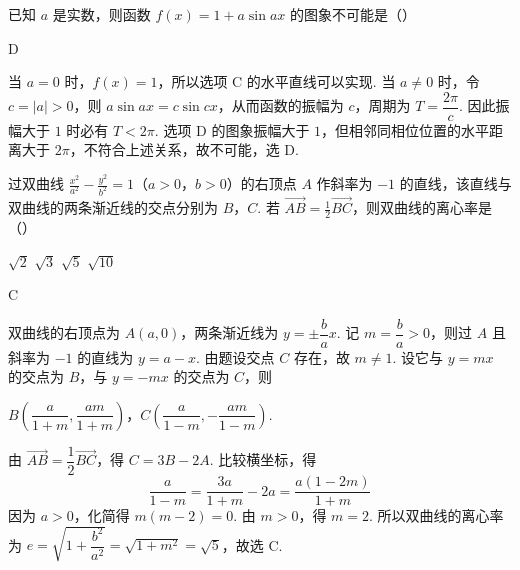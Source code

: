 \begin{problem}
已知 \(a\) 是实数，则函数 \(f(x)=1+a\sin ax\) 的图象不可能是（\quad）

    {}
    {}
    {}
\end{problem}

\begin{answer}
D
\end{answer}

\begin{solution}
当 \(a=0\) 时，\(f(x)=1\)，所以选项 C 的水平直线可以实现. 当 \(a\neq0\) 时，令 \(c=|a|>0\)，则 \(a\sin ax=c\sin cx\)，从而函数的振幅为 \(c\)，周期为 \(T=\dfrac{2\pi}{c}\). 因此振幅大于 \(1\) 时必有 \(T<2\pi\). 选项 D 的图象振幅大于 \(1\)，但相邻同相位位置的水平距离大于 \(2\pi\)，不符合上述关系，故不可能，选 D.
\end{solution}

\begin{problem}
过双曲线 \(\frac{x^2}{a^2}-\frac{y^2}{b^2}=1\)（\(a>0\)，\(b>0\)）的右顶点 \(A\) 作斜率为 \(-1\) 的直线，该直线与双曲线的两条渐近线的交点分别为 \(B\)，\(C\). 若 \(\overrightarrow{AB}=\frac{1}{2}\overrightarrow{BC}\)，则双曲线的离心率是（\quad）

\choices
    {\(\sqrt{2}\)}
    {\(\sqrt{3}\)}
    {\(\sqrt{5}\)}
    {\(\sqrt{10}\)}
\end{problem}

\begin{answer}
C
\end{answer}

\begin{solution}
双曲线的右顶点为 \(A(a,0)\)，两条渐近线为 \(y=\pm\dfrac{b}{a}x\). 记 \(m=\dfrac{b}{a}>0\)，则过 \(A\) 且斜率为 \(-1\) 的直线为 \(y=a-x\). 由题设交点 \(C\) 存在，故 \(m\ne1\). 设它与 \(y=mx\) 的交点为 \(B\)，与 \(y=-mx\) 的交点为 \(C\)，则

\(B\left(\dfrac{a}{1+m},\dfrac{am}{1+m}\right)\)，\(C\left(\dfrac{a}{1-m},-\dfrac{am}{1-m}\right)\).

由 \(\overrightarrow{AB}=\dfrac12\overrightarrow{BC}\)，得 \(C=3B-2A\). 比较横坐标，得
\[
\frac{a}{1-m}=\frac{3a}{1+m}-2a=\frac{a(1-2m)}{1+m}
\]
因为 \(a>0\)，化简得 \(m(m-2)=0\). 由 \(m>0\)，得 \(m=2\). 所以双曲线的离心率为 \(e=\sqrt{1+\dfrac{b^2}{a^2}}=\sqrt{1+m^2}=\sqrt5\)，故选 C.
\end{solution}

